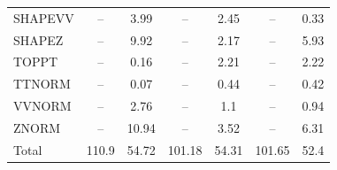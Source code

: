 \begin{table}[H]
\begin{center}
\begin{footnotesize}
\begin{tabular}{lcccccc}
				SHAPEVV & -- &  3.99 & -- &  2.45 & -- &  0.33 \\
				SHAPEZ & -- &  9.92 & -- &  2.17 & -- &  5.93 \\
				TOPPT & -- &  0.16 & -- &  2.21 & -- &  2.22 \\
				TTNORM & -- &  0.07 & -- &  0.44 & -- &  0.42 \\
				VVNORM & -- &  2.76 & -- &  1.1 & -- &  0.94 \\
				ZNORM & -- &  10.94 & -- &  3.52 & -- &  6.31 \\
				Total &  110.9  &  54.72 &  101.18  &  54.31 &  101.65  &  52.4 \\ \hline \hline
			\end{tabular}
			\label{tab:SysUncertainties_3000}
        \end{footnotesize}
	\end{center}
\end{table}



